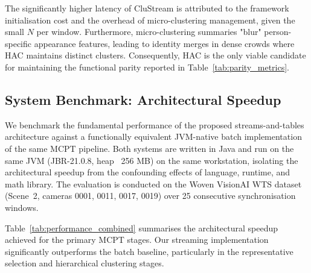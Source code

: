 \documentclass[review]{elsarticle}
\begin{document}
The significantly higher latency of CluStream is attributed to the framework initialisation cost and the overhead of micro-clustering management, given the small $N$ per window. Furthermore, micro-clustering summaries "blur" person-specific appearance features, leading to identity merges in dense crowds where HAC maintains distinct clusters. Consequently, HAC is the only viable candidate for maintaining the functional parity reported in Table~\ref{tab:parity_metrics}.

\subsection{System Benchmark: Architectural Speedup}
\label{sec:eval:speedup}

We benchmark the fundamental performance of the proposed streams-and-tables architecture against a functionally equivalent JVM-native batch implementation of the same MCPT pipeline. Both systems are written in Java and run on the same JVM (JBR-21.0.8, heap ~256 MB) on the same workstation, isolating the architectural speedup from the confounding effects of language, runtime, and math library. The evaluation is conducted on the Woven VisionAI WTS dataset~\cite{kong2024wts} (Scene~2, cameras 0001, 0011, 0017, 0019) over 25 consecutive synchronisation windows.

Table~\ref{tab:performance_combined} summarises the architectural speedup achieved for the primary MCPT stages. Our streaming implementation significantly outperforms the batch baseline, particularly in the representative selection and hierarchical clustering stages.
\end{document}
